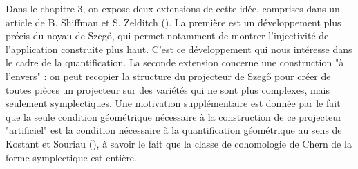 Dans le chapitre 3, on expose deux extensions de cette idée, comprises dans un article de B. Shiffman et S. Zelditch (\cite{Shiffman2002}). La première est un développement plus précis du noyau de Szeg\H{o}, qui permet notamment de montrer l'injectivité de l'application construite plus haut. C'est ce développement qui nous intéresse dans le cadre de la quantification. La seconde extension concerne une construction "à l'envers" : on peut recopier la structure du projecteur de Szeg\H{o} pour créer de toutes pièces un projecteur sur des variétés qui ne sont plus complexes, mais seulement symplectiques. Une motivation supplémentaire est donnée par le fait que la seule condition géométrique nécessaire à la construction de ce projecteur "artificiel" est la condition nécessaire à la quantification géométrique au sens de Kostant et Souriau (\cite{Woodhouse1997geometric}), à savoir le fait que la classe de cohomologie de Chern de la forme symplectique est entière.
